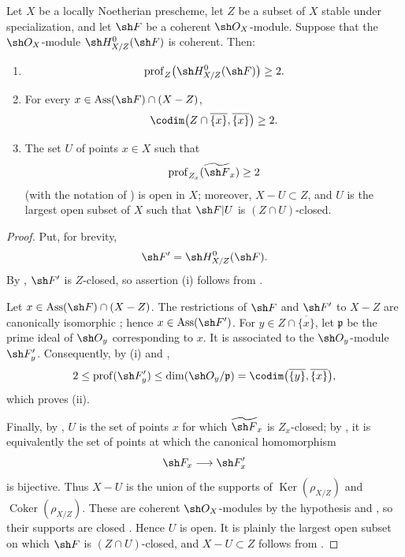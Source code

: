 \begin{proposition}[5.10.10]
\label{IV.5.10.10}
Let $X$ be a locally Noetherian prescheme, let $Z$ be a subset of
$X$ stable under specialization, and let $\sh F$ be a coherent
$\sh O_X$-module.  Suppose that the $\sh O_X$-module
$\sh H^0_{X/Z}(\sh F)$ is coherent.  Then:
\begin{enumerate}[{\rm(i)}]
  \item
  \[
    \operatorname{prof}_Z\bigl(\sh H^0_{X/Z}(\sh F)\bigr)\geq2.
  \]
  \item For every
  $x\in\operatorname{Ass}(\sh F)\cap(X-Z)$,
  \[
    \codim\bigl(Z\cap\overline{\{x\}},\overline{\{x\}}\bigr)
    \geq2.
  \]
  \item The set $U$ of points $x\in X$ such that
  \[
    \operatorname{prof}_{Z_x}(\widetilde{\sh F}_x)\geq2
  \]
  (with the notation of ) is open in $X$;
  moreover, $X-U\subset Z$, and $U$ is the largest open subset of
  $X$ such that $\sh F|U$ is $(Z\cap U)$-closed.
\end{enumerate}
\end{proposition}


\begin{proof}
Put, for brevity,
\[
  \sh F'=\sh H^0_{X/Z}(\sh F).
\]
By , $\sh F'$ is $Z$-closed, so assertion
{\rm(i)} follows from .

Let $x\in\operatorname{Ass}(\sh F)\cap(X-Z)$.  The restrictions of
$\sh F$ and $\sh F'$ to $X-Z$ are canonically isomorphic
; hence $x\in\operatorname{Ass}(\sh F')$.
For $y\in Z\cap\overline{\{x\}}$, let $\mathfrak p$ be the prime
ideal of $\sh O_y$ corresponding to $x$.  It is associated to the
$\sh O_y$-module $\sh F'_y$.  Consequently, by {\rm(i)} and
,
\[
  2\leq\operatorname{prof}(\sh F'_y)
   \leq\dim(\sh O_y/\mathfrak p)
   =\codim\bigl(\overline{\{y\}},\overline{\{x\}}\bigr),
\]
which proves {\rm(ii)}.

Finally, by , $U$ is the set of points $x$ for
which $\widetilde{\sh F}_x$ is $Z_x$-closed; by
, it is equivalently the set of points at which
the canonical homomorphism
\[
  \sh F_x\longrightarrow\sh F'_x
\]
is bijective.  Thus $X-U$ is the union of the supports of
$\operatorname{Ker}(\rho_{X/Z})$ and
$\operatorname{Coker}(\rho_{X/Z})$.  These are coherent
$\sh O_X$-modules by the hypothesis and , so
their supports are closed .  Hence $U$ is open.
It is plainly the largest open subset on which $\sh F$ is
$(Z\cap U)$-closed, and $X-U\subset Z$ follows from
.
\end{proof}


